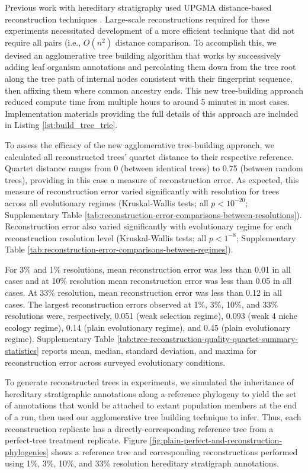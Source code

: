 Previous work with hereditary stratigraphy used UPGMA distance-based reconstruction techniques \citep{moreno2022hereditary}.
Large-scale reconstructions required for these experiments necessitated development of a more efficient technique that did not require all pairs (i.e., $O(n^2)$ distance comparison.
To accomplish this, we devised an agglomerative tree building algorithm that works by successively adding leaf organism annotations and percolating them down from the tree root along the tree path of internal nodes consistent with their fingerprint sequence, then affixing them where common ancestry ends.
This new tree-building approach reduced compute time from multiple hours to around 5 minutes in most cases.
Implementation materials providing the full details of this approach are included in Listing \ref{lst:build_tree_trie}.



To assess the efficacy of the new agglomerative tree-building approach, we calculated all reconstructed trees' quartet distance to their respective reference.
Quartet distance ranges from 0 (between identical trees) to 0.75 (between random trees), providing in this case a measure of reconstruction error.
As expected, this measure of reconstruction error varied significantly with resolution for trees across all evolutionary regimes (Kruskal-Wallis tests; all $p < 10^{-20}$; Supplementary Table \ref{tab:reconstruction-error-comparisons-between-resolutions}).
Reconstruction error also varied significantly with evolutionary regime for each reconstruction resolution level (Kruskal-Wallis tests; all $p < 1^{-8}$; Supplementary Table \ref{tab:reconstruction-error-comparisons-between-regimes}).

For 3\% and 1\% resolutions, mean reconstruction error was less than 0.01 in all cases and at 10\% resolution mean reconstruction error was less than 0.05 in all cases.
At 33\% resolution, mean reconstruction error was less than 0.12 in all cases.
The largest reconstruction errors observed at 1\%, 3\%, 10\%, and 33\% resolutions were, respectively, 0.051 (weak selection regime), 0.093 (weak 4 niche ecology regime), 0.14 (plain evolutionary regime), and 0.45 (plain evolutionary regime).
Supplementary Table \ref{tab:tree-reconstruction-quality-quartet-summary-statistics} reports mean, median, standard deviation, and maxima for reconstruction error across surveyed evolutionary conditions.

To generate reconstructed trees in experiments, we simulated the inheritance of hereditary stratigraphic annotations along a reference phylogeny to yield the set of annotations that would be attached to extant population members at the end of a run, then used our agglomerative tree building technique to infer.
Thus, each reconstruction replicate has a directly-corresponding reference tree from a perfect-tree treatment replicate.
Figure \ref{fig:plain-perfect-and-reconstruction-phylogenies} shows a reference tree and corresponding reconstructions performed using 1\%, 3\%, 10\%, and 33\% resolution hereditary stratigraph annotations.


